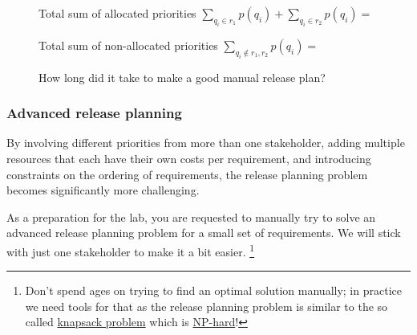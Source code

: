 \documentclass[11pt]{article}
\begin{document}
\begin{framed}
\begin{tabular}{| p{8mm} | p{12mm} | p{12mm} | p{1.4cm} | p{1.4cm} | p{1.4cm} |  p{1.4cm} |}
\hline
\end{tabular}
\begin{description}
\item[] \vspace{1em}Total sum of allocated priorities 
$\sum\limits_{q_i \in r_1} p(q_i)  + \sum\limits_{q_i \in r_2} p(q_i) = $ \underline{\hspace{3cm}}
\item[] \vspace{1em}Total sum of non-allocated priorities
$\sum\limits_{q_i \not\in r_1, r_2} p(q_i) = $ \hspace{8.5mm}\underline{\hspace{3cm}}
\item[] \vspace{1em}How long did it take to make a good manual release plan? \hspace{8.5mm}\underline{\hspace{2.3cm}}
\end{description}
\end{framed}

    

\subsubsection{Advanced release planning}\label{section:advRP}
By involving different priorities from more than one stakeholder, adding multiple resources that each have their own costs per requirement, and introducing constraints on the ordering of requirements, the release planning problem becomes significantly more challenging. 

As a preparation for the lab, you are requested to manually try to solve an advanced release planning problem for a small set of requirements. We will stick with just one stakeholder to make it a bit easier. \footnote{Don't spend ages on trying to find an optimal solution manually; in practice we need tools for that as the release planning problem is similar to the so called \href{http://en.wikipedia.org/wiki/Knapsack_problem}{knapsack problem} which is \href{http://en.wikipedia.org/wiki/NP-hard}{NP-hard}!}
\end{document}
